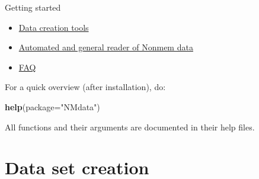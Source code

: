 \documentclass[
  8pt,
  ignorenonframetext,
  aspectratio=169]{beamer}
\newenvironment{Shaded}{\begin{snugshade}}{\end{snugshade}}
\newcommand{\DataTypeTok}[1]{\textcolor[rgb]{0.13,0.29,0.53}{#1}}
\newcommand{\KeywordTok}[1]{\textcolor[rgb]{0.13,0.29,0.53}{\textbf{#1}}}
\newcommand{\NormalTok}[1]{#1}
\newcommand{\StringTok}[1]{\textcolor[rgb]{0.31,0.60,0.02}{#1}}
\providecommand{\tightlist}{%
  \setlength{\itemsep}{0pt}\setlength{\parskip}{0pt}}
\begin{document}
\begin{frame}[fragile]{Getting started}
\begin{itemize}
\tightlist
\item
  \href{https://philipdelff.github.io/NMdata/articles/DataCreate.html}{Data
  creation tools}
\item
  \href{https://philipdelff.github.io/NMdata/articles/NMscanData.html}{Automated
  and general reader of Nonmem data}
\item
  \href{https://philipdelff.github.io/NMdata/articles/NMdata-FAQ.html}{FAQ}
\end{itemize}

For a quick overview (after installation), do:

\begin{Shaded}
\begin{Highlighting}[]
\KeywordTok{help}\NormalTok{(}\DataTypeTok{package=}\StringTok{"NMdata"}\NormalTok{)}
\end{Highlighting}
\end{Shaded}

All functions and their arguments are documented in their help files.
\end{frame}

\hypertarget{data-set-creation}{%
\section{Data set creation}\label{data-set-creation}}
\end{document}
